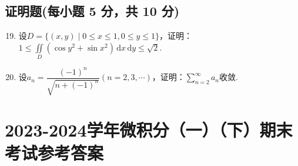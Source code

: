 \documentclass[../main.tex]{subfiles}
\begin{document}
\section{证明题(每小题 5 分，共 10 分)}
\begin{enumerate}
    \setcounter{enumi}{18}
    \item 设$D=\{(x,y)\mid0\leq x\leq1,0\leq y\leq1\}$，证明：$1\leq\iint\limits_{D}(\cos y^2+\sin x^2)\,\mathrm{d}x\,\mathrm{d}y\leq\sqrt{2}$.
          \vspace{10em}
    \item 设$a_n=\dfrac{(-1)^n}{\sqrt{n+(-1)^n}}(n=2,3,\cdots)$，证明：$\displaystyle\sum_{n=2}^{\infty}a_n$收敛.
          \vspace{10em}
\end{enumerate}
\chapter{2023-2024学年微积分（一）（下）期末考试参考答案}
\end{document}
